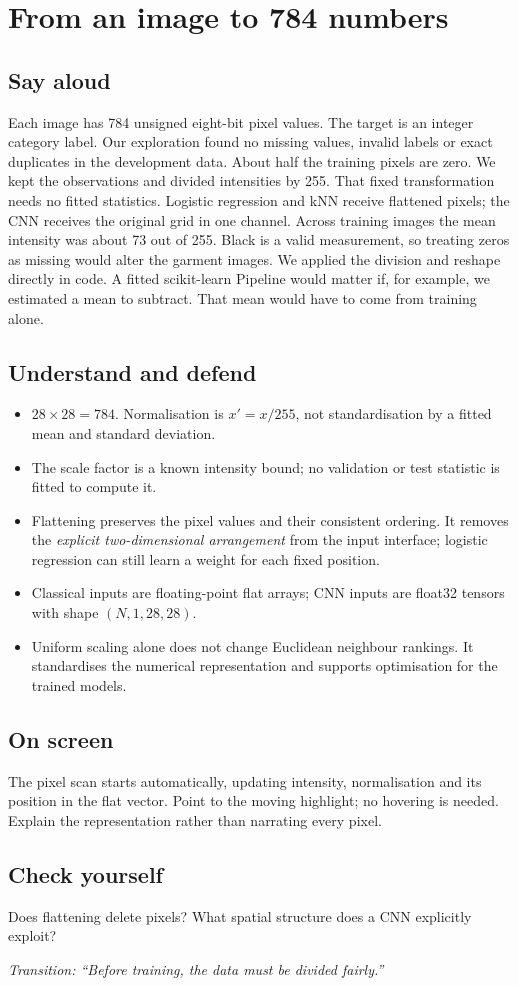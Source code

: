 \documentclass[11pt,a4paper]{article}
\newcommand{\slide}[3]{\clearpage{\small\color{olive}SLIDE #1\hfill Target: #3}\par\section{#2}}
\newcommand{\say}{\subsection{Say aloud}}
\newcommand{\understand}{\subsection{Understand and defend}}
\newcommand{\screen}{\subsection{On screen}}
\newcommand{\selfcheck}[1]{\subsection{Check yourself}#1}
\newcommand{\transition}[1]{\par\smallskip\textit{Transition: #1}}
\begin{document}
\slide{3}{From an image to 784 numbers}{55 seconds}
\say
Each image has 784 unsigned eight-bit pixel values. The target is an integer category label. Our exploration found no missing values, invalid labels or exact duplicates in the development data. About half the training pixels are zero. We kept the observations and divided intensities by 255. That fixed transformation needs no fitted statistics. Logistic regression and kNN receive flattened pixels; the CNN receives the original grid in one channel. Across training images the mean intensity was about 73 out of 255. Black is a valid measurement, so treating zeros as missing would alter the garment images. We applied the division and reshape directly in code. A fitted scikit-learn Pipeline would matter if, for example, we estimated a mean to subtract. That mean would have to come from training alone.
\understand
\begin{itemize}
\item $28\times28=784$. Normalisation is $x'=x/255$, not standardisation by a fitted mean and standard deviation.
\item The scale factor is a known intensity bound; no validation or test statistic is fitted to compute it.
\item Flattening preserves the pixel values and their consistent ordering. It removes the \emph{explicit two-dimensional arrangement} from the input interface; logistic regression can still learn a weight for each fixed position.
\item Classical inputs are floating-point flat arrays; CNN inputs are float32 tensors with shape $(N,1,28,28)$.
\item Uniform scaling alone does not change Euclidean neighbour rankings. It standardises the numerical representation and supports optimisation for the trained models.
\end{itemize}
\screen
The pixel scan starts automatically, updating intensity, normalisation and its position in the flat vector. Point to the moving highlight; no hovering is needed. Explain the representation rather than narrating every pixel.
\selfcheck{Does flattening delete pixels? What spatial structure does a CNN explicitly exploit?}
\transition{``Before training, the data must be divided fairly.''}
\end{document}
